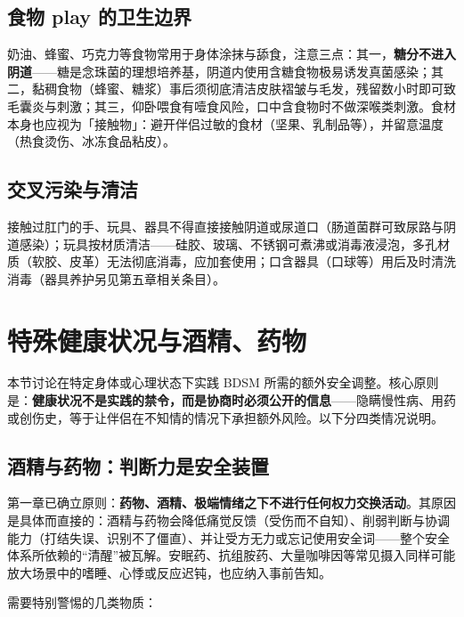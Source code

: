 \documentclass[12pt,UTF8]{ctexbook}
\newcommand{\keyword}[1]{\textbf{#1}}
\begin{document}
\subsection{食物 play 的卫生边界}

奶油、蜂蜜、巧克力等食物常用于身体涂抹与舔食，注意三点：其一，\textbf{糖分不进入阴道}——糖是念珠菌的理想培养基，阴道内使用含糖食物极易诱发真菌感染；其二，黏稠食物（蜂蜜、糖浆）事后须彻底清洁皮肤褶皱与毛发，残留数小时即可致毛囊炎与刺激；其三，仰卧喂食有噎食风险，口中含食物时不做深喉类刺激。食材本身也应视为「接触物」：避开伴侣过敏的食材（坚果、乳制品等），并留意温度（热食烫伤、冰冻食品粘皮）。

\subsection{交叉污染与清洁}

接触过肛门的手、玩具、器具不得直接接触阴道或尿道口（肠道菌群可致尿路与阴道感染）；玩具按材质清洁——硅胶、玻璃、不锈钢可煮沸或消毒液浸泡，多孔材质（软胶、皮革）无法彻底消毒，应加套使用；口含器具（口球等）用后及时清洗消毒（器具养护另见第五章相关条目）。


\section{特殊健康状况与酒精、药物}\label{sec:specialhealth}

本节讨论在特定身体或心理状态下实践 BDSM 所需的额外安全调整。核心原则是：\textbf{健康状况不是实践的禁令，而是协商时必须公开的信息}——隐瞒慢性病、用药或创伤史，等于让伴侣在不知情的情况下承担额外风险。以下分四类情况说明。

\subsection{酒精与药物：判断力是安全装置}

第一章已确立原则：\keyword{药物、酒精、极端情绪之下不进行任何权力交换活动}。其原因是具体而直接的：酒精与药物会降低痛觉反馈（受伤而不自知）、削弱判断与协调能力（打结失误、识别不了僵直）、并让受方无力或忘记使用安全词——整个安全体系所依赖的“清醒”被瓦解。安眠药、抗组胺药、大量咖啡因等常见摄入同样可能放大场景中的嗜睡、心悸或反应迟钝，也应纳入事前告知。

需要特别警惕的几类物质：
\end{document}
